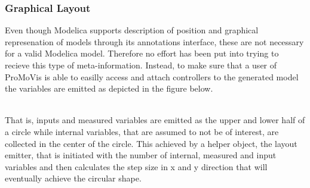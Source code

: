 \subsubsection{Graphical Layout}
Even though Modelica supports description of position and graphical represenation of models through its annotations interface, these are not necessary for a valid Modelica model. Therefore no effort has been put into trying to recieve this type of meta-information. Instead, to make sure that a user of ProMoVis is able to easilly access and attach controllers to the generated model the variables are emitted as depicted in the figure below.\\\newline
\setlength\fboxsep{0pt}
\setlength\fboxrule{0.5pt}
\\\newline

That is, inputs and measured variables are emitted as the upper and lower half of a circle while internal variables, that are assumed to not be of interest, are collected in the center of the circle. This achieved by a helper object, the layout emitter, that is initiated with the number of internal, measured and input variables and then calculates the step size in x and y direction that will eventually achieve the circular shape. 

